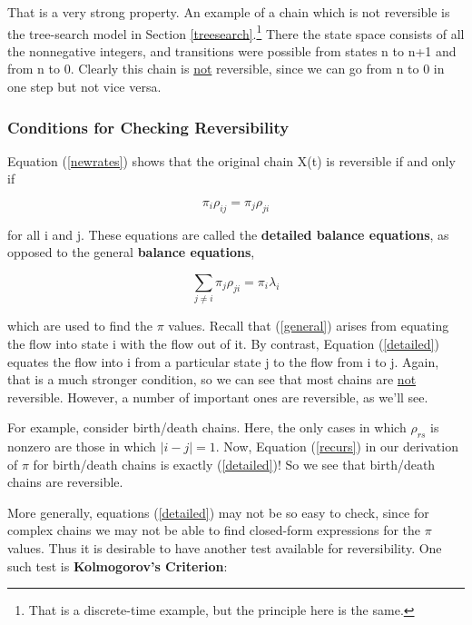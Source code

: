 That is a very strong property.  An example of a chain which is not
reversible is the tree-search model in Section
\ref{treesearch}.\footnote{That is a discrete-time example, but the
principle here is the same.}  There the state space consists of all the
nonnegative integers, and transitions were possible from states n to n+1
and from n to 0.  Clearly this chain is \underline{not} reversible,
since we can go from n to 0 in one step but not vice versa.

\subsubsection{Conditions for Checking Reversibility}

Equation (\ref{newrates}) shows that the original chain X(t) is
reversible if and only if 

\begin{equation}
\label{detailed}
\pi_i \rho_{ij} = \pi_j \rho_{ji}
\end{equation} 

for all i and j.  These equations are called the {\bf detailed balance
equations}, as opposed to the general {\bf balance equations},

\begin{equation}
\label{general}
\sum_{j\neq i}\pi_{j}\rho_{ji}=\pi_{i}\lambda_{i}
\end{equation}

which are used to find the $\pi$ values.  Recall that (\ref{general})
arises from equating the flow into state i with the flow out of it.  By
contrast, Equation (\ref{detailed}) equates the flow into i from a
particular state j to the flow from i to j.  Again, that is a much
stronger condition, so we can see that most chains are \underline{not}
reversible.  However, a number of important ones are reversible, as
we'll see.

For example, consider birth/death chains.  Here, the only cases in which
$\rho_{rs}$ is nonzero are those in which $|i -j| = 1$.  Now, Equation
(\ref{recurs}) in our derivation of $\pi$ for birth/death chains is
exactly (\ref{detailed})!  So we see that birth/death chains are
reversible.

More generally, equations (\ref{detailed}) may not be so easy to check,
since for complex chains we may not be able to find closed-form
expressions for the $\pi$ values.  Thus it is desirable to have another
test available for reversibility.  One such test is {\bf Kolmogorov's
Criterion}:

